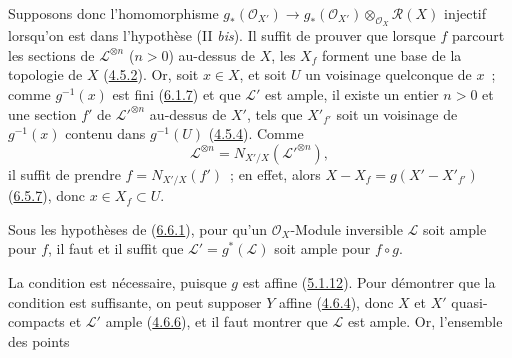 Supposons donc l'homomorphisme
$g_*(\mathcal{O}_{X'})\to
g_*(\mathcal{O}_{X'})\otimes_{\mathcal{O}_X}\mathcal{R}(X)$ injectif
lorsqu'on est dans l'hypothèse (II \emph{bis}). Il suffit de prouver que
lorsque $f$ parcourt les sections de $\mathcal{L}^{\otimes n}$ ($n>0$)
au-dessus de $X$, les $X_f$ forment une base de la topologie de $X$
(\hyperref[II.4.5.2-fr]{4.5.2}). Or, soit $x\in X$, et soit $U$ un voisinage
quelconque de $x$~; comme $g^{-1}(x)$ est fini
(\hyperref[II.6.1.7-fr]{6.1.7}) et que $\mathcal{L}'$ est ample, il existe un
entier $n>0$ et une section $f'$ de ${\mathcal{L}'}^{\otimes n}$ au-dessus de
$X'$, tels que $X'_{f'}$ soit un voisinage de $g^{-1}(x)$ contenu dans
$g^{-1}(U)$ (\hyperref[II.4.5.4-fr]{4.5.4}). Comme
\[
\mathcal{L}^{\otimes n}=N_{X'/X}({\mathcal{L}'}^{\otimes n}),
\]
il suffit de prendre $f=N_{X'/X}(f')$~; en effet, alors
$X-X_f=g(X'-X'_{f'})$ (\hyperref[II.6.5.7-fr]{6.5.7}), donc
$x\in X_f\subset U$.

\begin{corollary}[6.6.3]
\label{II.6.6.3-fr}
Sous les hypothèses de (\hyperref[II.6.6.1-fr]{6.6.1}), pour qu'un
$\mathcal{O}_X$-Module inversible $\mathcal{L}$ soit ample pour $f$, il faut
et il suffit que $\mathcal{L}'=g^*(\mathcal{L})$ soit ample pour $f\circ g$.
\end{corollary}

La condition est nécessaire, puisque $g$ est affine
(\hyperref[II.5.1.12-fr]{5.1.12}). Pour démontrer que la condition est
suffisante, on peut supposer $Y$ affine (\hyperref[II.4.6.4-fr]{4.6.4}), donc
$X$ et $X'$ quasi-compacts et $\mathcal{L}'$ ample
(\hyperref[II.4.6.6-fr]{4.6.6}), et il faut montrer que $\mathcal{L}$ est
ample. Or, l'ensemble des points

